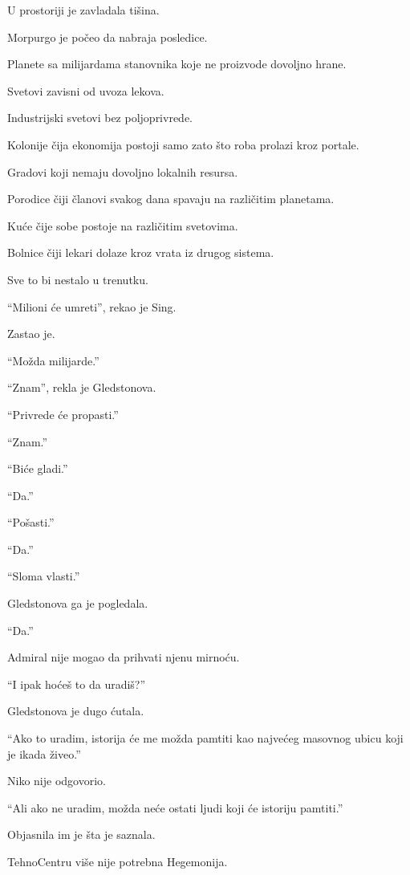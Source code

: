 U prostoriji je zavladala tišina.

\bigskip

Morpurgo je počeo da nabraja posledice.

Planete sa milijardama stanovnika koje ne proizvode dovoljno hrane.

Svetovi zavisni od uvoza lekova.

Industrijski svetovi bez poljoprivrede.

Kolonije čija ekonomija postoji samo zato što roba prolazi kroz portale.

Gradovi koji nemaju dovoljno lokalnih resursa.

Porodice čiji članovi svakog dana spavaju na različitim planetama.

Kuće čije sobe postoje na različitim svetovima.

Bolnice čiji lekari dolaze kroz vrata iz drugog sistema.

Sve to bi nestalo u trenutku.

\bigskip

``Milioni će umreti'', rekao je Sing.

Zastao je.

``Možda milijarde.''

``Znam'', rekla je Gledstonova.

``Privrede će propasti.''

``Znam.''

``Biće gladi.''

``Da.''

``Pošasti.''

``Da.''

``Sloma vlasti.''

Gledstonova ga je pogledala.

``Da.''

\bigskip

Admiral nije mogao da prihvati njenu mirnoću.

``I ipak hoćeš to da uradiš?''

Gledstonova je dugo ćutala.

``Ako to uradim, istorija će me možda pamtiti kao najvećeg masovnog ubicu koji je ikada živeo.''

Niko nije odgovorio.

``Ali ako ne uradim, možda neće ostati ljudi koji će istoriju pamtiti.''

\bigskip

Objasnila im je šta je saznala.

TehnoCentru više nije potrebna Hegemonija.

